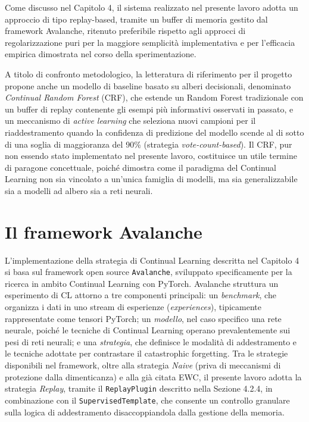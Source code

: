 \documentclass[12pt,a4paper]{report}
\begin{document}
Come discusso nel Capitolo 4, il sistema realizzato nel presente lavoro adotta un approccio di tipo replay-based, tramite un buffer di memoria gestito dal framework Avalanche, ritenuto preferibile rispetto agli approcci di regolarizzazione puri per la maggiore semplicità implementativa e per l'efficacia empirica dimostrata nel corso della sperimentazione.

A titolo di confronto metodologico, la letteratura di riferimento per il progetto propone anche un modello di baseline basato su alberi decisionali, denominato \emph{Continual Random Forest} (CRF), che estende un Random Forest tradizionale con un buffer di replay contenente gli esempi più informativi osservati in passato, e un meccanismo di \emph{active learning} che seleziona nuovi campioni per il riaddestramento quando la confidenza di predizione del modello scende al di sotto di una soglia di maggioranza del 90\% (strategia \emph{vote-count-based}). Il CRF, pur non essendo stato implementato nel presente lavoro, costituisce un utile termine di paragone concettuale, poiché dimostra come il paradigma del Continual Learning non sia vincolato a un'unica famiglia di modelli, ma sia generalizzabile sia a modelli ad albero sia a reti neurali.

\section{Il framework Avalanche}

L'implementazione della strategia di Continual Learning descritta nel Capitolo 4 si basa sul framework open source \texttt{Avalanche}, sviluppato specificamente per la ricerca in ambito Continual Learning con PyTorch. Avalanche struttura un esperimento di CL attorno a tre componenti principali: un \emph{benchmark}, che organizza i dati in uno stream di esperienze (\emph{experiences}), tipicamente rappresentate come tensori PyTorch; un \emph{modello}, nel caso specifico una rete neurale, poiché le tecniche di Continual Learning operano prevalentemente sui pesi di reti neurali; e una \emph{strategia}, che definisce le modalità di addestramento e le tecniche adottate per contrastare il catastrophic forgetting. Tra le strategie disponibili nel framework, oltre alla strategia \emph{Naive} (priva di meccanismi di protezione dalla dimenticanza) e alla già citata EWC, il presente lavoro adotta la strategia \emph{Replay}, tramite il \texttt{ReplayPlugin} descritto nella Sezione 4.2.4, in combinazione con il \texttt{SupervisedTemplate}, che consente un controllo granulare sulla logica di addestramento disaccoppiandola dalla gestione della memoria.
\end{document}
